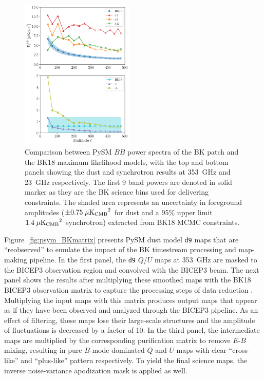 \documentclass[twocolumn]{aastex631}
\begin{document}
\begin{figure}
    \centering
    \includegraphics[width=0.48\textwidth]{figures/BKfield_power.pdf}
    \caption{Comparison between PySM $BB$ power spectra of the BK patch and the BK18 maximum likelihood models, with the top and bottom panels showing the dust and synchrotron results at 353~GHz and 23~GHz respectively. The first 9 band powers are denoted in solid marker as they are the BK science bins used for delivering constraints. The shaded area represents an uncertainty in foreground amplitudes ($\pm 0.75 \; \mu\rm{K_{CMB}}^2$ for dust and a 95\% upper limit $1.4 \; \mu\rm{K_{CMB}}^2$ synchrotron) extracted from BK18 MCMC constraints.}
    \label{fig:BKfield_power}
\end{figure}

Figure~\ref{fig:psym_BKmatrix} presents PySM dust model \texttt{d9} maps that are ``reobserved'' to emulate the impact of the BK timestream processing and map-making pipeline. In the first panel, the \texttt{d9} $Q$/$U$ maps at 353~GHz are masked to the BICEP3 observation region and convolved with the BICEP3 beam. The next panel shows the results after multiplying these smoothed maps with the BK18 BICEP3 observation matrix to capture the processing steps of data reduction \citep[e.g., filtering applied along RA scans,  beam deprojection in the linear map-making process][]{BICEP2Collaboration:2016}. Multiplying the input maps with this matrix produces output maps that appear as if they have been observed and analyzed through the BICEP3 pipeline. As an effect of filtering, these maps lose their large-scale structures and the amplitude of fluctuations is decreased by a factor of 10. In the third panel, the intermediate maps are multiplied by the corresponding purification matrix to remove $E$-$B$ mixing, resulting in pure $B$-mode dominated $Q$ and $U$ maps with clear ``cross-like'' and ``plus-like'' pattern respectively. To yield the final science maps, the inverse noise-variance apodization mask is applied as well.
\end{document}

